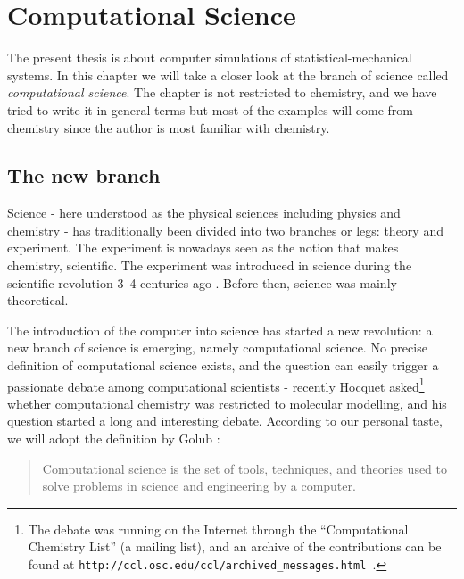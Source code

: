 
\chapter{Computational Science}
\label{chap:CompSci}
The present thesis is about computer simulations of
statistical-mechanical systems. In this chapter we will take a closer
look at the branch of science called \textit{computational
science}. The chapter is not restricted to chemistry, and we have
tried to write it in general terms but most of the examples will come
from chemistry since the author is most familiar with chemistry. 


\section{The new branch}
\label{sect:NewBranch}
Science - here understood as the physical sciences including physics
and chemistry - has traditionally been divided into two branches or
legs: theory and experiment. The experiment is nowadays seen as the
notion that makes \eg chemistry, scientific. The experiment was
introduced in science during the scientific revolution 3--4 centuries
ago \cite{Westfall71}. Before then, science was mainly theoretical.

The introduction of the computer into science has started a new
revolution: a new branch of science is emerging, namely computational
science. No precise definition of computational science exists,
and the question can easily trigger a passionate debate among
computational scientists - recently Hocquet asked\footnote{The debate
  was running on the Internet through the ``Computational Chemistry
  List'' (a mailing list), and an archive of the contributions can be
  found at
\texttt{http://ccl.osc.edu/ccl/archived{\_}messages.html }.}
whether computational chemistry was restricted to molecular modelling,
and his question started a long and interesting debate. According to
our personal taste, we will adopt the definition by Golub \etal
\cite{Golub92}: 

\begin{quotation}
\noindent Computational science is the set of tools, techniques, and
  theories used to solve problems in science and engineering by a
  computer. 
\end{quotation}

